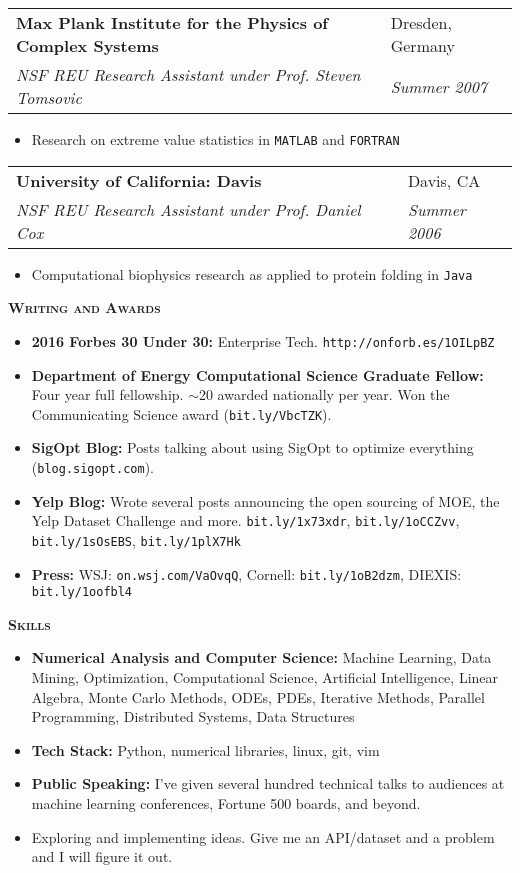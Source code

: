 \documentclass[letterpaper, 11pt]{article}
\makeatletter
\renewcommand{\section}[1]{%
  \begin{tcolorbox}
    \textsc{\textbf{\large{#1}}}
  \end{tcolorbox}
}
\newcommand{\entry}[4]{%
  \begin{tabularx}{\linewidth}{@{}Xl@{}}
    \textbf{#1} & #2          \\
    \textit{#3} & \textit{#4} \\
  \end{tabularx}
}
\makeatother
\begin{document}
  \entry{Max Plank Institute for the Physics of Complex Systems}{Dresden, Germany}{NSF REU Research Assistant under Prof. Steven Tomsovic}{Summer 2007}
  \begin{itemize}
    \item{Research on extreme value statistics in \texttt{MATLAB} and \texttt{FORTRAN}}
  \end{itemize}

  \entry{University of California: Davis}{Davis, CA}{NSF REU Research Assistant under Prof. Daniel Cox}{Summer 2006}
  \begin{itemize}
    \item{Computational biophysics research as applied to protein folding in \texttt{Java}}
  \end{itemize}

  \section{Writing and Awards}

  \begin{itemize}
    \item {\bf 2016 Forbes 30 Under 30:} Enterprise Tech. \texttt{http://onforb.es/1OILpBZ}
    \item {\bf Department of Energy Computational Science Graduate Fellow:} Four year full fellowship. $\sim$20 awarded nationally per year. Won the Communicating Science award (\texttt{bit.ly/VbcTZK}).
    \item {\bf SigOpt Blog:} Posts talking about using SigOpt to optimize everything (\texttt{blog.sigopt.com}).
    \item {\bf Yelp Blog:} Wrote several posts announcing the open sourcing of MOE, the Yelp Dataset Challenge and more. \texttt{bit.ly/1x73xdr}, \texttt{bit.ly/1oCCZvv}, \texttt{bit.ly/1sOsEBS}, \texttt{bit.ly/1plX7Hk}
    \item {\bf Press:} WSJ: \texttt{on.wsj.com/VaOvqQ}, Cornell: \texttt{bit.ly/1oB2dzm},  DIEXIS: \texttt{bit.ly/1oofbl4}
  \end{itemize}

  \section{Skills}

  \begin{itemize}
    \item {\bf Numerical Analysis and Computer Science:} Machine Learning, Data Mining, Optimization, Computational Science, Artificial Intelligence, Linear Algebra, Monte Carlo Methods, ODEs, PDEs, Iterative Methods, Parallel Programming, Distributed Systems, Data Structures
    \item {\bf Tech Stack:} Python, numerical libraries, linux, git, vim
    \item {\bf Public Speaking:} I've given several hundred technical talks to audiences at machine learning conferences, Fortune 500 boards, and beyond.
    \item Exploring and implementing ideas. Give me an API/dataset and a problem and I will figure it out.
  \end{itemize}
\end{document}
